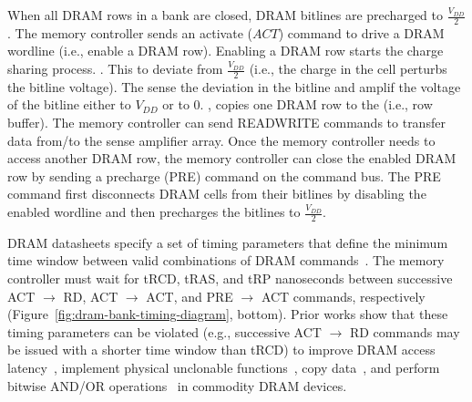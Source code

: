\noindent
{} When all DRAM rows in a {bank} are closed, DRAM bitlines are precharged to  {$\frac{V_{DD}}{2}$}. The memory controller sends an activate ($ACT$) command  to drive a DRAM wordline (i.e., enable a DRAM row). Enabling a DRAM row starts the {charge sharing} process. . This   to deviate from {$\frac{V_{DD}}{2}$} {(i.e., the charge in the cell perturbs the bitline voltage)}. The  sense the deviation in the bitline and amplif the voltage of the bitline either to {$V_{DD}$} or to $0$. ,  copies one DRAM row to the  (i.e., row buffer). The memory controller can send READ\newnew{/}WRITE commands to transfer data from/to {the sense amplifier array}. {Once the memory controller needs to access another DRAM row, t}he memory controller can close the {enabled} DRAM row by sending a precharge (PRE) command on the command bus. The PRE command first disconnects DRAM cells from their bitlines by disabling the enabled wordline and then precharges the bitlines to {$\frac{V_{DD}}{2}$}.

\noindent
{} DRAM datasheets specify a set of timing parameters that define the minimum time window between valid combinations of DRAM commands~\cite{lee.hpca15, kevinchang-thesis, chang.sigmetrics16, kim2018solar}. The memory controller must wait for tRCD, tRAS, and tRP nanoseconds between successive ACT $\rightarrow$ RD, ACT $\rightarrow$ ACT, and PRE $\rightarrow$ ACT commands, respectively {(Figure~\ref{fig:dram-bank-timing-diagram}, bottom)}. Prior works show that these timing parameters can be violated (e.g., successive ACT $\rightarrow$ RD commands may be issued with a shorter time window than tRCD) to improve DRAM access latency~\cite{lee.hpca15, chang.sigmetrics16, kevinchang-thesis, lee.sigmetrics17, kim2018solar}, implement physical unclonable functions~\cite{kim.hpca18,talukder2019exploiting,orosa2021codic},  copy data~\cite{seshadri2013rowclone,gao2020computedram}, and perform bitwise AND/OR operations~\cite{seshadri.micro17,seshadri.thesis16,seshadri.arxiv16,seshadri.bookchapter17.arxiv,gao2020computedram} in commodity DRAM devices.

